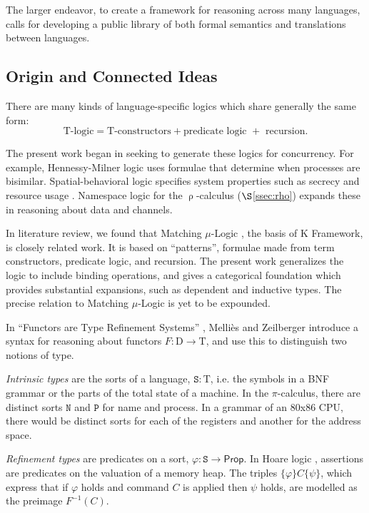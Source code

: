 \documentclass[12pt]{article}
\theoremstyle{definition}
\newcommand{\msf}[1]{\mathsf{#1}}
\newcommand{\mrm}[1]{\mathrm{#1}}
\newcommand{\mtt}[1]{\mathtt{#1}}
\newcommand{\T}{\mrm{T}}
\newcommand{\tts}{\mtt{S}}
\newcommand{\N}{\mtt{N}}
\newcommand{\PP}{\mtt{P}}
\begin{document}
The larger endeavor, to create a framework for reasoning across many languages, calls for developing a public library of both formal semantics and translations between languages.

\subsection{Origin and Connected Ideas}
\label{ssec:connected}

There are many kinds of language-specific logics which share generally the same form:
\[\T\text{-logic} = \T\text{-constructors} + \text{predicate logic } + \text{ recursion}.\]

The present work began in seeking to generate these logics for concurrency. For example, Hennessy-Milner logic \cite{hml} uses formulae that determine when processes are bisimilar. Spatial-behavioral logic \cite{caires} specifies system properties such as secrecy and resource usage \cite{spatial}. Namespace logic \cite{namespace} for the $\uprho$-calculus \cite{rhocal} ($\S$\ref{ssec:rho}) expands these in reasoning about data and channels.

In literature review, we found that Matching $\mu$-Logic \cite{matchlog}, the basis of K Framework, is closely related work. It is based on ``patterns'', formulae made from term constructors, predicate logic, and recursion.  The present work generalizes the logic to include binding operations, and gives a categorical foundation which provides substantial expansions, such as dependent and inductive types. The precise relation to Matching $\mu$-Logic is yet to be expounded.

In ``Functors are Type Refinement Systems'' \cite{refine}, Melli\`es and Zeilberger introduce a syntax for reasoning about functors $F:\mrm{D}\to \T$, and use this to distinguish two notions of type.

\textit{Intrinsic types} are the sorts of a language, $\tts:\T$, i.e. the symbols in a BNF grammar or the parts of the total state of a machine. In the $\pi$-calculus, there are distinct sorts $\N$ and $\PP$ for name and process. In a grammar of an 80x86 CPU, there would be distinct sorts for each of the registers and another for the address space.

\textit{Refinement types} are predicates on a sort, $\varphi:\tts\to \msf{Prop}$. In Hoare logic \cite{hoare}, assertions are predicates on the valuation of a memory heap. The triples $\{\varphi\}C\{\psi\}$, which express that if $\varphi$ holds and command $C$ is applied then $\psi$ holds, are modelled as the preimage $F^{-1}(C)$.
\end{document}
